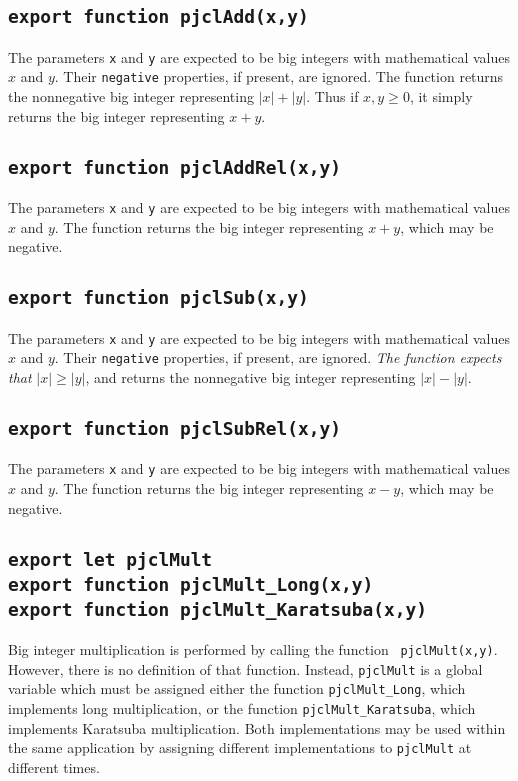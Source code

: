 \documentclass[12pt]{article}
\begin{document}
\subsection{\tt export function pjclAdd(x,y)}

The parameters {\tt x} and {\tt y} are expected to be big integers
with mathematical values $x$ and $y$.  Their {\tt negative}
properties, if present, are ignored.  The function returns the
nonnegative big integer representing $|x| + |y|$.  Thus if $x, y \geq 0$,
it simply returns the big integer representing $x+y$.

\subsection{\tt export function pjclAddRel(x,y)}

The parameters {\tt x} and {\tt y} are expected to be big integers
with mathematical values $x$ and $y$.  The function returns
the big integer representing $x+y$, which may be negative.

\subsection{\tt export function pjclSub(x,y)}

The parameters {\tt x} and {\tt y} are expected to be big integers
with mathematical values $x$ and $y$.  Their {\tt negative}
properties, if present, are ignored.  {\em The function expects
  that\/} $|x| \geq |y|$, and returns the nonnegative big integer
representing $|x| - |y|$.

\subsection{\tt export function pjclSubRel(x,y)}

The parameters {\tt x} and {\tt y} are expected to be big
integers with mathematical values $x$ and $y$.  The function returns
the big integer representing $x-y$, which may be negative.

\subsection{\tt export let pjclMult\\export function pjclMult\_Long(x,y)\\export function pjclMult\_Karatsuba(x,y)}

Big integer multiplication is performed by calling the function {\tt
 pjclMult(x,y)}.  However, there is no definition of that function.
Instead, {\tt pjclMult} is a global variable which must be assigned
either the function {\tt pjclMult\_Long}, which implements long
multiplication, or the function {\tt pjclMult\_Karatsuba}, which
implements Karatsuba multiplication.  Both implementations may be used
within the same application by assigning different implementations to
{\tt pjclMult} at different times.
\end{document}
